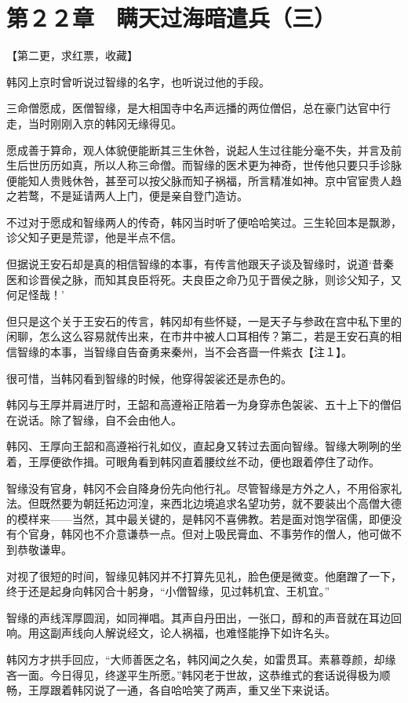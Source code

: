 \section{第２２章　瞒天过海暗遣兵（三）}

【第二更，求红票，收藏】

韩冈上京时曾听说过智缘的名字，也听说过他的手段。

三命僧愿成，医僧智缘，是大相国寺中名声远播的两位僧侣，总在豪门达官中行走，当时刚刚入京的韩冈无缘得见。

愿成善于算命，观人体貌便能断其三生休咎，说起人生过往能分毫不失，并言及前生后世历历如真，所以人称三命僧。而智缘的医术更为神奇，世传他只要只手诊脉便能知人贵贱休咎，甚至可以按父脉而知子祸福，所言精准如神。京中官宦贵人趋之若鹜，不是延请两人上门，便是亲自登门造访。

不过对于愿成和智缘两人的传奇，韩冈当时听了便哈哈笑过。三生轮回本是飘渺，诊父知子更是荒谬，他是半点不信。

但据说王安石却是真的相信智缘的本事，有传言他跟天子谈及智缘时，说道‘昔秦医和诊晋侯之脉，而知其良臣将死。夫良臣之命乃见于晋侯之脉，则诊父知子，又何足怪哉！’

但只是这个关于王安石的传言，韩冈却有些怀疑，一是天子与参政在宫中私下里的闲聊，怎么这么容易就传出来，在市井中被人口耳相传？第二，若是王安石真的相信智缘的本事，当智缘自告奋勇来秦州，当不会吝啬一件紫衣【注１】。

很可惜，当韩冈看到智缘的时候，他穿得袈裟还是赤色的。

韩冈与王厚并肩进厅时，王韶和高遵裕正陪着一为身穿赤色袈裟、五十上下的僧侣在说话。除了智缘，自不会由他人。

韩冈、王厚向王韶和高遵裕行礼如仪，直起身又转过去面向智缘。智缘大咧咧的坐着，王厚便欲作揖。可眼角看到韩冈直着腰纹丝不动，便也跟着停住了动作。

智缘没有官身，韩冈不会自降身份先向他行礼。尽管智缘是方外之人，不用俗家礼法。但既然要为朝廷拓边河湟，来西北边境追求名望功劳，就不要装出个高僧大德的模样来——当然，其中最关键的，是韩冈不喜佛教。若是面对饱学宿儒，即便没有个官身，韩冈也不介意谦恭一点。但对上吸民膏血、不事劳作的僧人，他可做不到恭敬谦卑。

对视了很短的时间，智缘见韩冈并不打算先见礼，脸色便是微变。他磨蹭了一下，终于还是起身向韩冈合十躬身，“小僧智缘，见过韩机宜、王机宜。”

智缘的声线浑厚圆润，如同禅唱。其声自丹田出，一张口，醇和的声音就在耳边回响。用这副声线向人解说经文，论人祸福，也难怪能挣下如许名头。

韩冈方才拱手回应，“大师善医之名，韩冈闻之久矣，如雷贯耳。素慕尊颜，却缘吝一面。今日得见，终遂平生所愿。”韩冈老于世故，这恭维式的套话说得极为顺畅，王厚跟着韩冈说了一通，各自哈哈笑了两声，重又坐下来说话。

